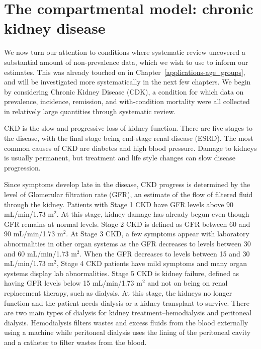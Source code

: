 \chapter{The compartmental model: chronic kidney disease}
\label{applications-fits_incon_v_con}

We now turn our attention to conditions where systematic review
uncovered a substantial amount of non-prevalence data, which we wish
to use to inform our estimates.  This was already touched on in
Chapter~\ref{applications-age_groups}, and will be investigated more
systematically in the next few chapters.  We begin by considering
Chronic Kidney Disease (CDK), a condition for which data on
prevalence, incidence, remission, and with-condition mortality were
all collected in relatively large quantities through systematic
review.

CKD is the slow and
progressive loss of kidney function. There are five stages to the
disease, with the final stage being end-stage renal
disease (ESRD). The most common causes of CKD are diabetes and high
blood pressure.  Damage to kidneys is usually permanent, but treatment
and life style changes can slow disease
progression. \cite{_k/doqi_2002}

Since symptoms develop late in the disease, CKD progress is determined
by the level of Glomerular filtration rate (GFR), an estimate of the
flow of filtered fluid through the kidney. Patients with Stage 1 CKD
have GFR levels above 90 mL/min/1.73 m$^2$.  At this stage, kidney
damage has already begun even though GFR remains at normal levels.
Stage 2 CKD is defined as GFR between 60 and 90 mL/min/1.73 m$^2$.  At
Stage 3 CKD, a few symptoms appear with laboratory abnormalities in
other organ systems as the GFR decreases to levels between 30 and 60
mL/min/1.73 m$^2$.  When the GFR decreases to levels between 15 and 30
mL/min/1.73 m$^2$, Stage 4 CKD patients have mild symptoms and many
organ systems display lab abnormalities.  Stage 5 CKD is kidney
failure, defined as having GFR levels below 15 mL/min/1.73 m$^2$ and
not on being on renal replacement therapy, such as dialysis.  At this
stage, the kidneys no longer function and the patient needs dialysis
or a kidney transplant to survive.  There are two main types of
dialysis for kidney treatment--hemodialysis and peritoneal dialysis.
Hemodialysis filters wastes and excess fluids from the blood
externally using a machine while peritoneal dialysis uses the lining
of the peritoneal cavity and a catheter to filter wastes from the
blood. \cite{_k/doqi_2002, dipiro_pharmacotherapy:_2008}

